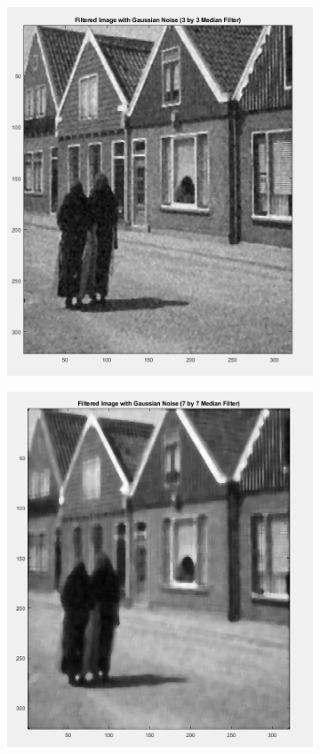 \begin{figure}
    \centering
    \begin{subfigure}{0.4\textwidth}
        \includegraphics[width=\textwidth]{Resources/F8-a.png}
        \caption{}
        \label{fig:first}
    \end{subfigure}
    \hfill
    \begin{subfigure}{0.4\textwidth}
        \includegraphics[width=\textwidth]{Resources/F8-b.png}

\end{subfigure}
\end{figure}
